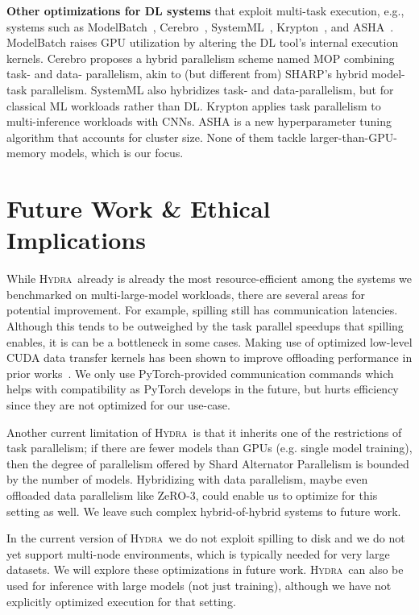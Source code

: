 \documentclass{article}
\newcommand{\system}{\textsc{Hydra}}
\begin{document}
\textbf{Other optimizations for DL systems} that exploit multi-task execution, e.g., systems such as ModelBatch~\cite{modelbatch}, Cerebro~\cite{cerebro:kumar}, SystemML~\cite{systemml}, Krypton~\cite{krypton}, and ASHA~\cite{asha}. ModelBatch raises GPU utilization by altering the DL tool's internal execution kernels. Cerebro proposes a hybrid parallelism scheme named MOP combining task- and data- parallelism, akin to (but different from) SHARP's hybrid model-task parallelism. SystemML also hybridizes task- and data-parallelism, but for classical ML workloads rather than DL. Krypton applies task parallelism to multi-inference workloads with CNNs. ASHA is a new hyperparameter tuning algorithm that accounts for cluster size. None of them tackle larger-than-GPU-memory models, which is our focus. 

\section{Future Work \& Ethical Implications}
\label{sec:improvements}
While \system~already is already the most resource-efficient among the systems we benchmarked on multi-large-model workloads, there are several areas for potential improvement. For example, spilling still has communication latencies. Although this tends to be outweighed by the task parallel speedups that spilling enables, it is can be a bottleneck in some cases. Making use of optimized low-level CUDA data transfer kernels has been shown to improve offloading performance in prior works~\cite{zeroDeep,l2l}. We only use PyTorch-provided communication commands which helps with compatibility as PyTorch develops in the future, but hurts efficiency since they are not optimized for our use-case. 

Another current limitation of \system~is that it inherits one of the restrictions of task parallelism; if there are fewer models than GPUs (e.g. single model training), then the degree of parallelism offered by Shard Alternator Parallelism is bounded by the number of models. Hybridizing with data parallelism, maybe even offloaded data parallelism like ZeRO-3, could enable us to optimize for this setting as well. We leave such complex hybrid-of-hybrid systems to future work.

In the current version of \system~we do not exploit spilling to disk and we do not yet support multi-node environments, which is typically needed for very large datasets. We will explore these optimizations in future work. \system~can also be used for inference with large models (not just training), although we have not explicitly optimized execution for that setting.
\end{document}
